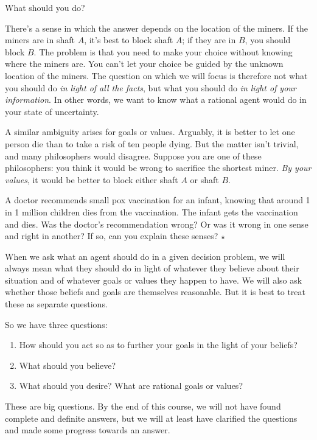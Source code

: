 What should you do?

There's a sense in which the answer depends on the location of the
miners. If the miners are in shaft $A$, it's best to block shaft $A$;
if they are in $B$, you should block $B$. The problem is that you need
to make your choice without knowing where the miners are. You can't
let your choice be guided by the unknown location of the miners. The
question on which we will focus is therefore not what you should do
\emph{in light of all the facts}, but what you should do \emph{in
  light of your information}. In other words, we want to know what a
rational agent would do in your state of uncertainty.

A similar ambiguity arises for goals or values. Arguably, it is better
to let one person die than to take a risk of ten people dying. But the
matter isn't trivial, and many philosophers would disagree. Suppose
you are one of these philosophers: you think it would be wrong to
sacrifice the shortest miner. \emph{By your values}, it would be
better to block either shaft $A$ or shaft $B$.

\begin{exercise}
  A doctor recommends small pox vaccination for an infant, knowing
  that around 1 in 1 million children dies from the vaccination. The
  infant gets the vaccination and dies. Was the doctor's
  recommendation wrong? Or was it wrong in one sense and right in
  another? If so, can you explain these senses? $\star$
\end{exercise}

When we ask what an agent should do in a given decision problem, we
will always mean what they should do in light of whatever they believe
about their situation and of whatever goals or values they happen to
have. We will also ask whether those beliefs and goals are themselves
reasonable. But it is best to treat these as separate questions.

So we have three questions:
\begin{enumerate}
  \itemsep0em 
\item How should you act so as to further your goals in the light of
  your beliefs?
\item What should you believe?
\item What should you desire? What are rational goals or values?
\end{enumerate}
These are big questions. By the end of this course, we will not have
found complete and definite answers, but we will at least have
clarified the questions and made some progress towards an answer.

